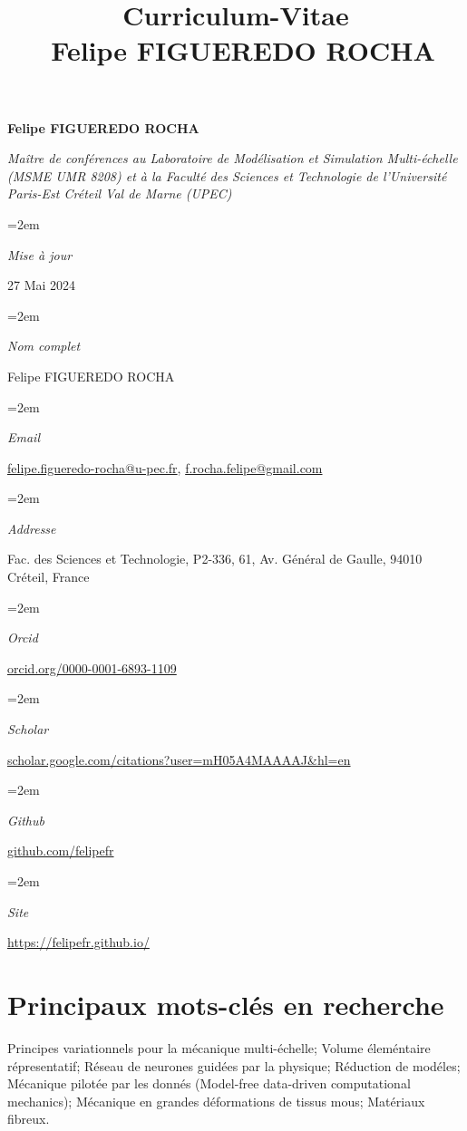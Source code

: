 \documentclass[french]{article}
\title{\Large {\bf Curriculum-Vitae} \\ Felipe FIGUEREDO ROCHA}
\date{}
\newcommand{\sepspace}{\vspace*{1em}}
\newcommand{\name}[1]{
	\huge %
	\begin{center} \textbf{#1} \end{center}\par
	\normalsize\normalfont}
\newcommand{\motto}[1]{
	\large %
	\begin{center} \textsl{#1}\end{center}\par
	\normalsize \normalfont}
\newcommand{\info}[2]{
	\noindent\hangindent=2em\hangafter=0
	\parbox{60pt}{\textsl{#1}} %
		#2 \par
} %
\begin{document}

\name{Felipe FIGUEREDO ROCHA}
\vspace*{-10pt}
\motto{Maître de conférences au Laboratoire de Modélisation et Simulation Multi-échelle (MSME UMR 8208) et à la Faculté des Sciences et Technologie de l'Université Paris-Est Créteil Val de Marne (UPEC)}
\sepspace
\info{Mise à jour}{27 Mai 2024}
\info{Nom complet}{Felipe FIGUEREDO ROCHA}
\info{Email}{\url{felipe.figueredo-rocha@u-pec.fr}, \url{f.rocha.felipe@gmail.com}}
\info{Addresse}{Fac. des Sciences et Technologie, P2-336, 61, Av. Général de Gaulle, 94010 Créteil, France}
\info{Orcid}{\url{orcid.org/0000-0001-6893-1109}}
\info{Scholar}{\url{scholar.google.com/citations?user=mH05A4MAAAAJ&hl=en}}
\info{Github}{\url{github.com/felipefr}}
\info{Site}{\url{https://felipefr.github.io/}}


\section*{Principaux mots-clés en recherche}
%
Principes variationnels pour la mécanique multi-échelle; Volume éleméntaire répresentatif; Réseau de neurones guidées par la physique; Réduction de modéles; Mécanique pilotée par les donnés (Model-free data-driven computational mechanics);  Mécanique en grandes déformations de tissus mous;  Matériaux fibreux.  
\end{document}

